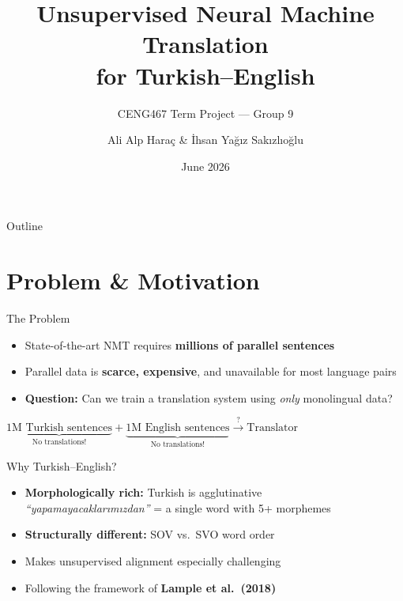 \documentclass[aspectratio=169]{beamer}
\title{Unsupervised Neural Machine Translation\\for Turkish--English}
\subtitle{CENG467 Term Project — Group 9}
\author{Ali Alp Haraç \& İhsan Yağız Sakızlıoğlu}
\date{June 2026}
\institute{Izmir Institute of Technology}
\begin{document}
\begin{frame}
  \titlepage
\end{frame}

\begin{frame}{Outline}
  \tableofcontents
\end{frame}

\section{Problem \& Motivation}

\begin{frame}{The Problem}
  \begin{itemize}
    \item State-of-the-art NMT requires \textbf{millions of parallel sentences}
    \item Parallel data is \textbf{scarce, expensive}, and unavailable for most language pairs
    \item \textbf{Question:} Can we train a translation system using \emph{only} monolingual data?
  \end{itemize}
  \vfill
  \begin{center}
    \Large $\underbrace{\text{1M Turkish sentences}}_{\text{No translations!}} + \underbrace{\text{1M English sentences}}_{\text{No translations!}} \xrightarrow{?} \text{Translator}$
  \end{center}
\end{frame}

\begin{frame}{Why Turkish--English?}
  \begin{itemize}
    \item \textbf{Morphologically rich:} Turkish is agglutinative \\
          \quad \textit{``yapamayacaklarımızdan''} = a single word with 5+ morphemes
    \item \textbf{Structurally different:} SOV vs.\ SVO word order
    \item Makes unsupervised alignment especially challenging
    \item Following the framework of \textbf{Lample et al.\ (2018)}
  \end{itemize}
\end{frame}
\end{document}

